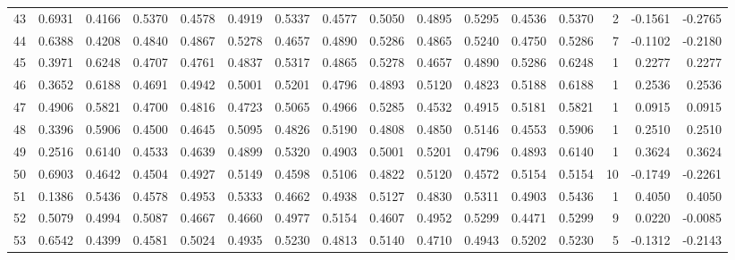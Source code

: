 \begin{tabular}{lrrrrrrrrrrrrrrr}
43  &      0.6931 &  0.4166 &  0.5370 &  0.4578 &  0.4919 &  0.5337 &  0.4577 &  0.5050 &  0.4895 &  0.5295 &   0.4536 &     0.5370 &      2 &                   -0.1561 &                    -0.2765 \\
44  &      0.6388 &  0.4208 &  0.4840 &  0.4867 &  0.5278 &  0.4657 &  0.4890 &  0.5286 &  0.4865 &  0.5240 &   0.4750 &     0.5286 &      7 &                   -0.1102 &                    -0.2180 \\
45  &      0.3971 &  0.6248 &  0.4707 &  0.4761 &  0.4837 &  0.5317 &  0.4865 &  0.5278 &  0.4657 &  0.4890 &   0.5286 &     0.6248 &      1 &                    0.2277 &                     0.2277 \\
46  &      0.3652 &  0.6188 &  0.4691 &  0.4942 &  0.5001 &  0.5201 &  0.4796 &  0.4893 &  0.5120 &  0.4823 &   0.5188 &     0.6188 &      1 &                    0.2536 &                     0.2536 \\
47  &      0.4906 &  0.5821 &  0.4700 &  0.4816 &  0.4723 &  0.5065 &  0.4966 &  0.5285 &  0.4532 &  0.4915 &   0.5181 &     0.5821 &      1 &                    0.0915 &                     0.0915 \\
48  &      0.3396 &  0.5906 &  0.4500 &  0.4645 &  0.5095 &  0.4826 &  0.5190 &  0.4808 &  0.4850 &  0.5146 &   0.4553 &     0.5906 &      1 &                    0.2510 &                     0.2510 \\
49  &      0.2516 &  0.6140 &  0.4533 &  0.4639 &  0.4899 &  0.5320 &  0.4903 &  0.5001 &  0.5201 &  0.4796 &   0.4893 &     0.6140 &      1 &                    0.3624 &                     0.3624 \\
50  &      0.6903 &  0.4642 &  0.4504 &  0.4927 &  0.5149 &  0.4598 &  0.5106 &  0.4822 &  0.5120 &  0.4572 &   0.5154 &     0.5154 &     10 &                   -0.1749 &                    -0.2261 \\
51  &      0.1386 &  0.5436 &  0.4578 &  0.4953 &  0.5333 &  0.4662 &  0.4938 &  0.5127 &  0.4830 &  0.5311 &   0.4903 &     0.5436 &      1 &                    0.4050 &                     0.4050 \\
52  &      0.5079 &  0.4994 &  0.5087 &  0.4667 &  0.4660 &  0.4977 &  0.5154 &  0.4607 &  0.4952 &  0.5299 &   0.4471 &     0.5299 &      9 &                    0.0220 &                    -0.0085 \\
53  &      0.6542 &  0.4399 &  0.4581 &  0.5024 &  0.4935 &  0.5230 &  0.4813 &  0.5140 &  0.4710 &  0.4943 &   0.5202 &     0.5230 &      5 &                   -0.1312 &                    -0.2143 \\

\end{tabular}
